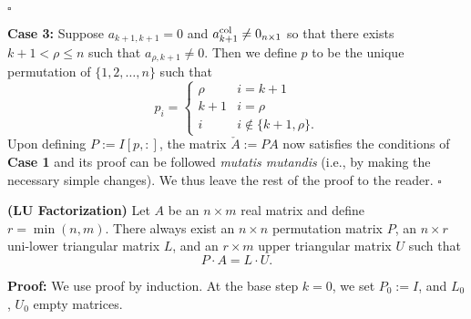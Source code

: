 \hfill $\square$

\textbf{Case 3:} Suppose $a_{k+1, k+1} = 0$ and $a^{\rm col}_{k+1}\neq 0_{n \times 1}$ so that there exists $k+1 < \rho \le n$ such that $a_{\rho, k+1} \neq 0$. Then we define $p$ to be the unique permutation of $\{1, 2, \ldots, n\}$ such that 
$$p_i= \begin{cases} \rho & i= k+1\\ k+1 &  i = \rho \\  i &  i \not \in \{k+1, \rho \}. \end{cases} $$
Upon defining $P:=I[p,:]$, the matrix $\check{A}:=P A$ now satisfies the conditions of \textbf{Case 1} and its proof can be followed \textit{mutatis mutandis} (i.e., by making the necessary simple changes). We thus leave the rest of the proof to the reader. 
\hfill $\square$

\Qed

\begin{thm}
\textbf{(LU Factorization)}
Let $A$ be an $n \times m$ real matrix and define $r=\min(n,m)$. There always exist an $n \times n$ permutation matrix $P$, an $n \times r$ uni-lower triangular matrix $L$, and an $ r \times m$ upper triangular matrix $U$ such that
$$P \cdot A = L \cdot U. $$
\end{thm}

\textbf{Proof:} We use proof by induction. At the base step $k=0$, we set $P_0:=I$, and $L_0$, $U_0$ empty matrices. \\


